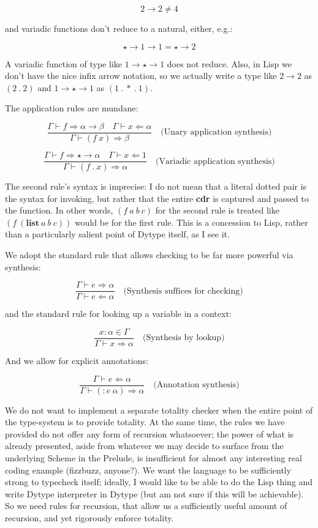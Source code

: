 \documentclass{article}
\begin{document}
\[ 2\to{}2 \not = 4 \]

and variadic functions don't reduce to a natural, either, e.g.:

\[ \star\to{}1\to{}1 =
  \star\to{}2 \]

A variadic function of type like
$1\to\star\to{}1$ does not reduce. Also, in
Lisp we don't have the nice infix arrow notation, so we actually write a type
like $2\to{}2$ as $(2~.~2)$ and $1\to\star\to{}1$ as $(1~.~*~.~1)$.

The application rules are mundane:

\[ \frac{\Gamma\vdash f\mathbin{\Rightarrow}\alpha\to\beta\quad\Gamma\vdash
    x\mathbin{\Leftarrow}\alpha}{\Gamma\vdash
    (f~x)\mathbin{\Rightarrow}\beta}\quad\text{(Unary application synthesis)} \]

\[ \frac{\Gamma\vdash f\mathbin{\Rightarrow}\star\to\alpha\quad\Gamma\vdash
    x\mathbin{\Leftarrow}1}{\Gamma\vdash
    (f~.~x)\mathbin{\Rightarrow}\alpha}\quad\text{(Variadic application synthesis)} \]

The second rule's syntax is imprecise: I do not mean that a literal dotted pair
is the syntax for invoking, but rather that the entire \textbf{cdr} is captured
and passed to the function. In other words, $(f~a~b~c)$ for the second rule is
treated like $(f~(\textbf{list}~a~b~c))$ would be for the first rule. This is a
concession to Lisp, rather than a particularly salient point of Dytype itself,
as I see it.

We adopt the standard rule that allows checking to be far more powerful via
synthesis:

\[ \frac{\Gamma\vdash e\mathbin{\Rightarrow}\alpha}{\Gamma\vdash
    e\mathbin{\Leftarrow}\alpha}\quad\text{(Synthesis suffices for checking)} \]

and the standard rule for looking up a variable in a context:

\[ \frac{x\mathbin{:}\alpha\in\Gamma}{\Gamma\vdash
    x\mathbin{\Rightarrow}\alpha}\quad\text{(Synthesis by lookup)} \]

And we allow for explicit annotations:

\[ \frac{\Gamma\vdash e\mathbin{\Leftarrow}\alpha}{\Gamma\vdash
    (: e~\alpha)\mathbin{\Rightarrow}\alpha}\quad\text{(Annotation synthesis)} \]

We do not want to implement a separate totality checker when the entire point of
the type-system is to provide totality. At the same time, the rules we have
provided do not offer any form of recursion whatsoever; the power of what is
already presented, aside from whatever we may decide to surface from the
underlying Scheme in the Prelude, is insufficient for almost any interesting
real coding example (fizzbuzz, anyone?). We want the language to be sufficiently
strong to typecheck itself; ideally, I would like to be able to do the Lisp
thing and write Dytype interpreter in Dytype (but am not sure if this will be
achievable). So we need rules for recursion, that allow us a sufficiently useful
amount of recursion, and yet rigorously enforce totality.
\end{document}
